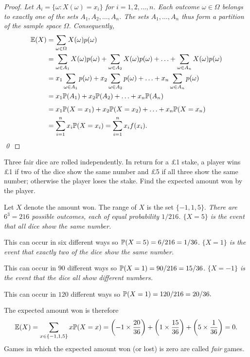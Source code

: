 \begin{proof}
\bit
\it Let $A_i = \{\omega: X(\omega) = x_i\}$ for $i=1,2,\ldots,n$.
\it Each outcome $\omega\in\Omega$ belongs to exactly one of the sets $A_1,A_2,\ldots,A_n$.
\it The sets $A_1,\ldots,A_n$ thus form a partition of the sample space $\Omega$.
\eit
Consequently, 
\begin{align*}
\mathbb{E}(X) 
	& = \sum_{\omega\in\Omega} X(\omega)p(\omega) \\
	& = \sum_{\omega\in A_1} X(\omega)p(\omega) + \sum_{\omega\in A_2} X(\omega)p(\omega) + \ldots + \sum_{\omega\in A_n} X(\omega)p(\omega) \\
	& = x_1\sum_{\omega\in A_1}p(\omega) + x_2\sum_{\omega\in A_2} p(\omega) + \ldots + x_n\sum_{\omega\in A_n} p(\omega) \\
	& = x_1\mathbb{P}(A_1) + x_2\mathbb{P}(A_2) + \ldots + x_n\mathbb{P}(A_n) \\[1ex]
	& = x_1\mathbb{P}(X=x_1) + x_2\mathbb{P}(X=x_2) + \ldots + x_n\mathbb{P}(X=x_n) \\
	& = \sum_{i=1}^n x_i \mathbb{P}(X=x_i)
	= \sum_{i=1}^n x_i f(x_i).
\end{align*}
\qed
\end{proof}

\begin{example}
Three fair dice are rolled independently. In return for a \pounds 1 stake, a player wins \pounds 1 if two of the dice show the same number and \pounds 5 if all three show the same number; otherwise the player loses the stake. Find the expected amount won by the player.
\begin{solution}
Let $X$ denote the amount won. The range of $X$ is the set $\{-1,1,5\}$.
\bit
\it There are $6^3 = 216$ possible outcomes, each of equal probability $1/216$.
\it $\{X=5\}$ is the event that all dice show the same number.
\par This can occur in six different ways so $\mathbb{P}(X=5) = 6/216 = 1/36$.
\it $\{X=1\}$ is the event that exactly two of the dice show the same number.
\par This can occur in $90$ different ways so $\mathbb{P}(X=1) = 90/216 = 15/36$.
\it $\{X=-1\}$ is the event that the dice all show different numbers.
\par This can occur in $120$ different ways so $\mathbb{P}(X=1) = 120/216 = 20/36.$
\eit

The expected amount won is therefore
\[
\mathbb{E}(X) = \sum_{x\in\{-1,1,5\}} x\mathbb{P}(X=x)
	= \left(-1\times\frac{20}{36}\right) +\left(1\times\frac{15}{36}\right) +\left(5\times\frac{1}{36}\right) 
	= 0.
\]
Games in which the expected amount won (or lost) is zero are called \emph{fair} games.
\end{solution}
\end{example}


